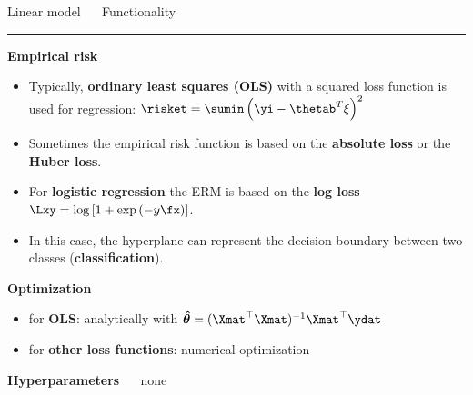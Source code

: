 \documentclass[11pt,compress,t,notes=noshow, xcolor=table]{beamer}
\begin{document}
\LARGE
\begin{frame}{\textcolor{gray!80}{Linear model} ~~ Functionality}
\normalsize
\vspace{-0.5cm}
\noindent \textcolor{gray!80}{\rule{\textwidth}{1pt}}

\vspace{0.3cm}




\footnotesize

\textbf{\textcolor{gray!80}{Empirical risk}}
\begin{itemize}\footnotesize
  \item Typically, \textbf{ordinary least squares (OLS)} with a squared loss function is used for regression: $\risket  = \sumin \left(\yi - \thetab^T \xi\right)^2$
    
   \item Sometimes the empirical risk function is based on the \textbf{absolute loss} or the \textbf{Huber loss}. %
  
  \item For \textbf{logistic regression} the ERM is based on the \textbf{log loss} $\Lxy = \log \left[1 + \exp \left(-y\fx\right)\right]$.
  
  \item In this case, the hyperplane can represent the decision boundary between two classes (\textbf{classification}). 


\end{itemize}

\footnotesize

\medskip

\textbf{\textcolor{gray!80}{Optimization}} ~~ 
\begin{itemize}\footnotesize
  \item for \textbf{OLS}: analytically with $\bm{\hat \theta} = (\Xmat^\top \Xmat)^{-1} \Xmat^\top\ydat$
  \item for \textbf{other loss functions}: numerical optimization 
\end{itemize}

\medskip

\textbf{\textcolor{gray!80}{Hyperparameters}} ~~ none

\end{frame}

\end{document}
